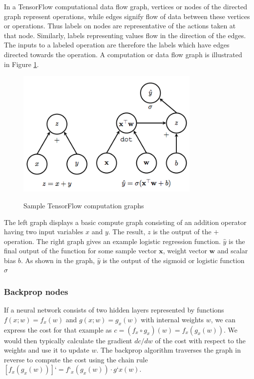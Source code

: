 In a TensorFlow computational data flow graph, vertices or nodes of the directed graph represent operations, while edges signify flow of data between these vertices or operations. Thus labels on nodes are representative of the actions taken at that node.  Similarly, labels representing values flow in the direction of the edges. The inputs to a labeled operation are therefore the labels which have edges directed towards the operation. A computation or data flow graph is illustrated in Figure \ref{fig_c3_tfg}. 
\begin{figure}
\centering
  \includegraphics[width=9cm]{thesis/images/tfgraph}\\
  \caption{Sample TensorFlow computation graphs\citep{goldsborough2016tour}}\label{fig_c3_tfg}
\end{figure}

The left graph displays a basic compute graph consisting of an addition operator having two input variables $x$ and $y$.  The result, $z$ is the output of the $+$ operation.  The right graph gives an example logistic regression function. $\hat{y}$ is the final output of the function for some sample vector $\mathbf{x}$, weight vector $\mathbf{w}$ and scalar bias $b$.  As shown in the graph, $\hat{y}$ is the output of the sigmoid or logistic function $\sigma$

\subsubsection{Backprop nodes}
If a neural network consists of two hidden layers represented by functions $f(x;w)=f_x(w)$ and $g(x;w)=g_x(w)$ with internal weights $w$, we can express the cost for that example as $c=(f_x \circ g_x)(w)=f_x(g_x(w))$.  We would then typically calculate the gradient $dc/dw$ of the cost with respect to the weights and use it to update $w$.  The backprop algorithm traverses the graph in reverse to compute the cost using the chain rule $[f_x(g_x(w))]‘=f‘_x(g_x(w))\cdot g‘x(w)$.

